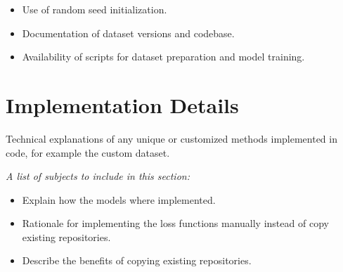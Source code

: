 \begin{itemize}
    \item Use of random seed initialization.
    \item Documentation of dataset versions and codebase.
    \item Availability of scripts for dataset preparation and model training.
\end{itemize}

\section{Implementation Details}
Technical explanations of any unique or customized methods implemented in code, for example the custom dataset.

\textit{A list of subjects to include in this section:}

\begin{itemize}
    \item Explain how the models where implemented.
    \item Rationale for implementing the loss functions manually instead of copy existing repositories.
    \item Describe the benefits of copying existing repositories.
\end{itemize}

